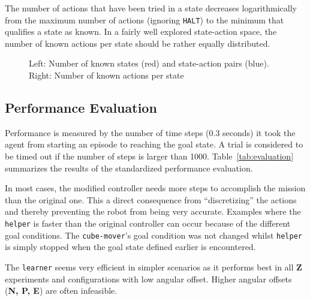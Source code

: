 The number of actions that have been tried in a state decreases logarithmically from the maximum number of actions (ignoring \texttt{HALT}) to the minimum that qualifies a state as known. In a fairly well explored state-action space, the number of known actions per state should be rather equally distributed.

\begin{figure}
\center
\hfill
\caption{Left: Number of known states (red) and state-action pairs (blue). Right: Number of known actions per state}
\end{figure}


\subsection{Performance Evaluation}
Performance is measured by the number of time steps (0.3 seconds) it took the agent from starting an episode to reaching the goal state. A trial is considered to be timed out if the number of steps is larger than 1000.
Table~\ref{tab:evaluation} summarizes the results of the standardized performance evaluation.

In most cases, the modified controller needs more steps to accomplish the mission than the original one. This a direct consequence from ``discretizing'' the actions and thereby preventing the robot from being very accurate. Examples where the \texttt{helper} is faster than the original controller can occur because of the different goal conditions. The \texttt{cube-mover}'s goal condition was not changed whilst \texttt{helper} is simply stopped when the goal state defined earlier is encountered.

The \texttt{learner} seems very efficient in simpler scenarios as it performs best in all \textbf{Z} experiments and configurations with low angular offset. Higher angular offsets (\textbf{N, P, E}) are often infeasible.

